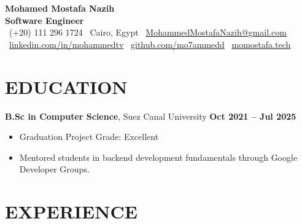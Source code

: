 \documentclass[letterpaper, 11pt]{article}
\begin{document}
\begin{center}
    {\LARGE \textbf{Mohamed Mostafa Nazih}}\\[0.15em]
    \textbf{Software Engineer} \\[0.15em]
    \faPhone~(+20) 111 296 1724 \quad
    \faMapMarker~Cairo, Egypt \quad
    \faEnvelope~\href{mailto:MohammedMostafaNazih@gmail.com}{MohammedMostafaNazih@gmail.com} \\[0.15em]
    {\small
    \faLinkedin~\href{http://linkedin.com/in/mohammedtv}{linkedin.com/in/mohammedtv} \quad
    \faGithub~\href{https://github.com/mo7ammedd}{github.com/mo7ammedd} \quad
    \faGlobe~\href{https://momostafa.tech}{momostafa.tech}
    }
\end{center}



\section{EDUCATION}
\vspace{0.5em}
\textbf{B.Sc in Computer Science}, Suez Canal University \hfill \textbf{Oct 2021 -- Jul 2025} \\
\vspace{-1em}
\begin{itemize}[leftmargin=1.5em, nosep, itemsep=0.1em]
  \item Graduation Project Grade: Excellent
  \item Mentored students in backend development fundamentals through Google Developer Groups.
\end{itemize}


\section{EXPERIENCE}
\vspace{0.5em}
\end{document}
